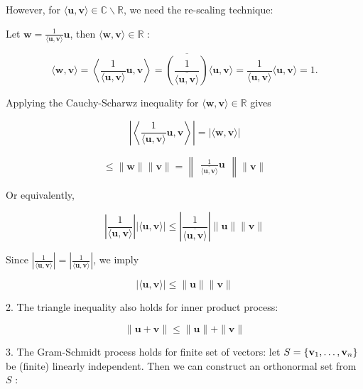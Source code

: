 \documentclass[11pt]{article}
\begin{document}
However, for \(\langle \mathbf{u},\mathbf{v}\rangle  \in  \mathbb{C} \smallsetminus  \mathbb{R}\), we need the re-scaling technique:

Let \(\mathbf{w} = \frac1{\langle \mathbf{u},\mathbf{v}\rangle }\mathbf{u}\), then \(\langle \mathbf{w},\mathbf{v}\rangle  \in  \mathbb{R}\) :

\[
\langle \mathbf{w},\mathbf{v}\rangle  = \left\langle  {\frac1{\langle \mathbf{u},\mathbf{v}\rangle }\mathbf{u},\mathbf{v}}\right\rangle   = \overline{\left( \frac1{\overline{\langle \mathbf{u},\mathbf{v}\rangle }}\right) }\langle \mathbf{u},\mathbf{v}\rangle  = \frac1{\langle \mathbf{u},\mathbf{v}\rangle }\langle \mathbf{u},\mathbf{v}\rangle  = 1.
\]

Applying the Cauchy-Scharwz inequality for \(\langle \mathbf{w},\mathbf{v}\rangle  \in  \mathbb{R}\) gives

\[
\left| \left\langle  {\frac1{\langle \mathbf{u},\mathbf{v}\rangle }\mathbf{u},\mathbf{v}}\right\rangle  \right|  = \left| {\langle \mathbf{w},\mathbf{v}\rangle }\right|
\]

\[
\leq  \parallel \mathbf{w}\parallel \parallel \mathbf{v}\parallel  = \begin{Vmatrix}{\frac1{\overline{\langle \mathbf{u},\mathbf{v}\rangle }}\mathbf{u}}\end{Vmatrix}\parallel \mathbf{v}\parallel
\]

Or equivalently,

\[
\left| \frac1{\langle \mathbf{u},\mathbf{v}\rangle }\right| \left| {\langle \mathbf{u},\mathbf{v}\rangle }\right|  \leq  \left| \frac1{\overline{\langle \mathbf{u},\mathbf{v}\rangle }}\right| \parallel \mathbf{u}\parallel \parallel \mathbf{v}\parallel
\]

Since \(\left| \frac1{\langle \mathbf{u},\mathbf{v}\rangle }\right|  = \left| \frac1{\langle \mathbf{u},\mathbf{v}\rangle }\right|\), we imply

\[
\left| {\langle \mathbf{u},\mathbf{v}\rangle }\right|  \leq  \parallel \mathbf{u}\parallel \parallel \mathbf{v}\parallel
\]

2. The triangle inequality also holds for inner product process:

\[
\parallel \mathbf{u} + \mathbf{v}\parallel  \leq  \parallel \mathbf{u}\parallel  + \parallel \mathbf{v}\parallel
\]

3. The Gram-Schmidt process holds for finite set of vectors: let \(S = \left\{  {{\bf v}_1,\ldots ,{\bf v}_n}\right\}\) be (finite) linearly independent. Then we can construct an orthonormal set from \(S\) :
\end{document}
